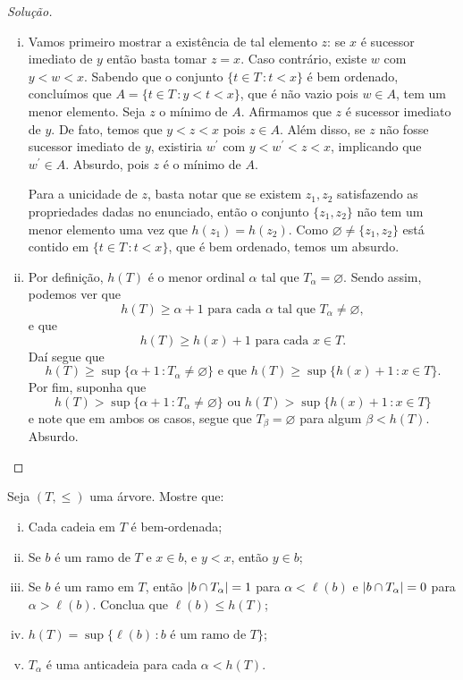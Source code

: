 \documentclass[a4paper]{article}
\begin{document}
\begin{proof}[Solução]
\begin{enumerate}[(i)]
  \item 
Vamos primeiro mostrar a existência de tal elemento \(z\): se \(x\) é sucessor
imediato de \(y\) então basta tomar \(z=x\). Caso contrário,
existe \(w\) com \(y < w < x\). Sabendo que o conjunto \(\{t \in T\,\colon t
<x\}\) é bem ordenado, concluímos que \(A = \{ t \in T
\,\colon y < t < x\}\), que é não vazio pois \(w\in A\), tem um menor elemento. Seja
\(z\) o mínimo de \(A\). Afirmamos que \(z\) é sucessor imediato de \(y\).
De fato, temos que \(y < z < x\) pois \(z \in A\). Além disso, se \(z\) não
fosse sucessor imediato de \(y\), existiria \(w^\prime\) com
\(y< w^\prime<z<x\), implicando que \(w^\prime\in A\). Absurdo, pois \(z\) é o mínimo de \(A\).


Para a unicidade de \(z\), basta notar que se existem \(z_1,z_2\) satisfazendo
as propriedades dadas no enunciado, então o conjunto
\(\{z_1,z_2\}\) não tem um menor elemento uma vez que \(h(z_1)=h(z_2)\). Como
\(\varnothing\not=\{z_1,z_2\}\) está contido em \(\{t \in T\,\colon t
<x\}\), que é bem ordenado, temos um absurdo.

  \item  Por definição, \(h(T)\) é o menor ordinal
    \(\alpha\) tal que \(T_\alpha=\varnothing\). Sendo assim, podemos ver que
    \[h(T)\geq \alpha +1 \text{ para cada } \alpha \text{ tal que }
      T_\alpha\not=\varnothing,\]
    e que
    \[h(T)\geq h(x)+1\text{ para cada } x\in T.\]
    Daí segue que
    \[h(T)\geq \sup\{\alpha+1\,\colon T_\alpha\not=\varnothing\}\text{ e que }
      h(T)\geq\sup\{h(x)+1\,\colon x\in T\}.\]
    Por fim, suponha que
    \[h(T)> \sup\{\alpha+1\,\colon T_\alpha\not=\varnothing\}\text{ ou } h(T)
      >\sup\{h(x)+1\,\colon x\in T\}\]
    e note que em ambos os casos, segue que \(T_\beta=\varnothing\) para algum \(\beta<
    h(T)\). Absurdo.\qedhere
\end{enumerate}
\end{proof}
\begin{exercicio}\label{3.2}
    Seja \((T,\leq)\) uma árvore. Mostre que:
    \begin{enumerate}[(i)]
    \item Cada cadeia em \(T\) é bem-ordenada;
    \item Se \(b\) é um ramo de \(T\) e \(x\in b\), e \(y<x\), então \(y\in b\);
    \item Se \(b\) é um ramo em \(T\), então \(\vert b\cap T_\alpha \vert=1\) para
      \(\alpha <\ell (b)\) e \(\vert b\cap T_\alpha \vert=0\) para \(\alpha
      >\ell (b)\). Conclua que \(\ell (b)\leq h(T)\);
    \item \(h(T)=\sup\{\ell (b)\,\colon b \text{ é um ramo de } T\}\);
    \item \(T_\alpha\) é uma anticadeia para cada \(\alpha < h(T)\).
     \end{enumerate}
  \end{exercicio}
\end{document}
